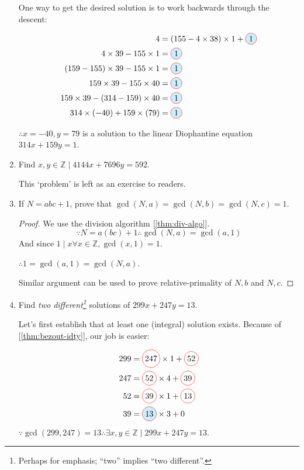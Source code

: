 \documentclass[english,notitlepage,smartquotes]{hgbreport}
\theoremstyle{definition}
\theoremstyle{remark}
\theoremstyle{plain}
\newcommand*\circled[1]{\tikz[baseline=(char.base)]{
    \node[shape=circle,draw=red,inner sep=2pt] (char) {#1};}}
\newcommand*\fillcircled[2]{\tikz[baseline=(char.base)]{
    \node[shape=circle,fill=#2,draw=red,inner sep=2pt] (char) {#1};}}
\begin{document}
\begin{enumerate}[label=\textbf{\arabic*}.]
One way to get the desired solution is to work backwards through the descent:

\begin{align*}
4&=(155-4\times 38)\times 1+\fillcircled{1}{cyan!20}\\
4\times 39-155\times 1&=\fillcircled{1}{cyan!20}\\
(159-155)\times 39-155\times 1&=\fillcircled{1}{cyan!20}\\
159\times 39-155\times 40&=\fillcircled{1}{cyan!20}\\
159\times 39-(314-159)\times 40&=\fillcircled{1}{cyan!20}\\
314\times(-40)+159\times(79)&=\fillcircled{1}{cyan!20}
\end{align*}

$\therefore x=-40,y=79$ is a solution to the linear Diophantine equation $314x+159y=1$.

\item Find $x,y\in\mathbb{Z}\mid 4144x+7696y=592$.\\
\label{pr:14}

This `problem' is left as an exercise to readers.

\item If $N=abc+1$, prove that $\gcd(N,a)=\gcd(N,b)=\gcd(N,c)=1$. 
\label{pr:15}
\begin{proof}
We use the division algorithm [\ref{thm:div-algo}].
$$
\because N=a(bc)+1 \therefore \gcd(N,a)=\gcd(a,1)
$$
And since $1\mid x\forall x\in\mathbb{Z}, \gcd(x,1)=1$.

$\therefore 1=\gcd(a,1)=\gcd(N,a)$.

Similar argument can be used to prove relative-primality of $N,b$ and $N,c$. 
\end{proof}

\item Find \emph{two different\footnote{Perhaps for emphasis; ``two'' implies ``two different''.}} solutions of $299x+247y=13$.
\label{pr:16}

Let's first establish that at least one (integral) solution exists. Because of [\ref{thm:bezout-idty}], our job is easier:

\begin{align*}
299&=\circled{247}\times 1+\circled{52}\\
247&=\circled{52}\times 4+\circled{39}\\
52&=\circled{39}\times 1+\circled{13}\\
39&=\fillcircled{13}{cyan!20}\times 3+0
\end{align*}
$\because\gcd(299,247)=13 \therefore \exists x,y\in\mathbb{Z}\mid 299x+247y=13$.


\end{enumerate}
\end{document}
